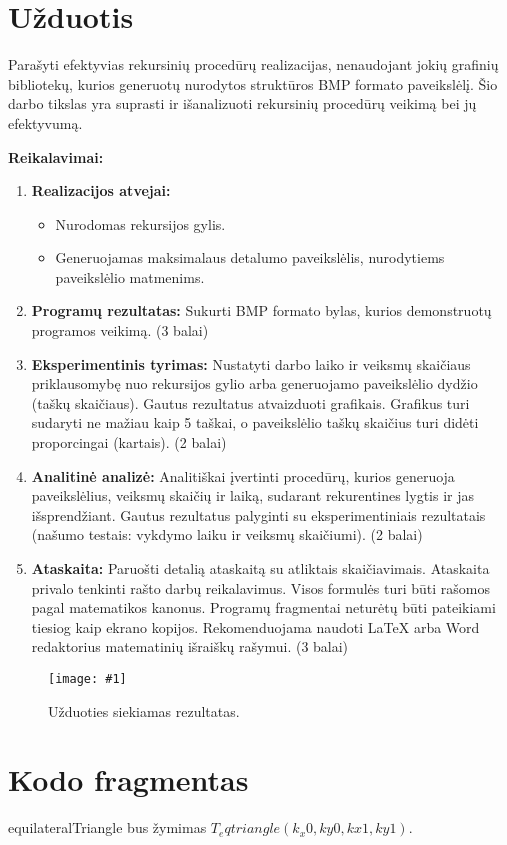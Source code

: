 \documentclass[a4paper,12pt]{article}
\newcommand{\imgc}[4]{
    \begin{figure}[h!]
        \centering
        \texttt{[image: \#1]}
        \caption{#3}  %
        \label{#4}  %
    \end{figure}
}
\newcommand{\code}[2]{
    
}
\begin{document}


\tableofcontents \newpage

\section{Užduotis}
Parašyti efektyvias rekursinių procedūrų realizacijas, nenaudojant jokių grafinių bibliotekų, kurios generuotų nurodytos struktūros BMP formato paveikslėlį. Šio darbo tikslas yra suprasti ir išanalizuoti rekursinių procedūrų veikimą bei jų efektyvumą.

\textbf{Reikalavimai:}
\begin{enumerate}
    \item \textbf{Realizacijos atvejai:}
    \begin{itemize}
        \item Nurodomas rekursijos gylis.
        \item Generuojamas maksimalaus detalumo paveikslėlis, nurodytiems paveikslėlio matmenims.
    \end{itemize}
    \item \textbf{Programų rezultatas:} Sukurti BMP formato bylas, kurios demonstruotų programos veikimą. (3 balai)
    \item \textbf{Eksperimentinis tyrimas:} Nustatyti darbo laiko ir veiksmų skaičiaus priklausomybę nuo rekursijos gylio arba generuojamo paveikslėlio dydžio (taškų skaičiaus). Gautus rezultatus atvaizduoti grafikais. Grafikus turi sudaryti ne mažiau kaip 5 taškai, o paveikslėlio taškų skaičius turi didėti proporcingai (kartais). (2 balai)
    \item \textbf{Analitinė analizė:} Analitiškai įvertinti procedūrų, kurios generuoja paveikslėlius, veiksmų skaičių ir laiką, sudarant rekurentines lygtis ir jas išsprendžiant. Gautus rezultatus palyginti su eksperimentiniais rezultatais (našumo testais: vykdymo laiku ir veiksmų skaičiumi). (2 balai)
    \item \textbf{Ataskaita:} Paruošti detalią ataskaitą su atliktais skaičiavimais. Ataskaita privalo tenkinti rašto darbų reikalavimus. Visos formulės turi būti rašomos pagal matematikos kanonus. Programų fragmentai neturėtų būti pateikiami tiesiog kaip ekrano kopijos. Rekomenduojama naudoti \LaTeX{} arba Word redaktorius matematinių išraiškų rašymui. (3 balai)
\end{enumerate}


\imgc{nuotraukos/Uzduotis.png}{0.8}{Užduoties siekiamas rezultatas.}{}

\section{Kodo fragmentas}

equilateralTriangle bus žymimas $T_eqtriangle(k_x0, ky0, kx1, ky1).$


\code{kodas/example.cs}{csharpstyle}



 
\end{document}
